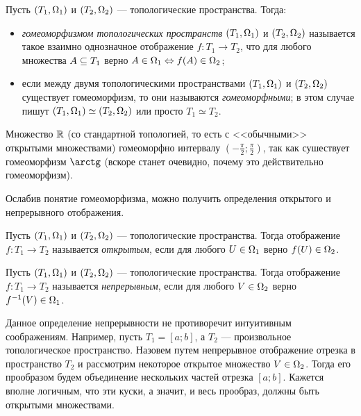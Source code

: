 \documentclass[main]{subfiles}
\begin{document}
\begin{definition}
	Пусть $ (T_1, \Omega_1) $ и $ (T_2, \Omega_2) $ --- топологические пространства. Тогда:
	\begin{itemize}
		\item \emph{гомеоморфизмом топологических пространств} $ (T_1, \Omega_1) $ и $ (T_2, \Omega_2) $ называется такое
			взаимно однозначное отображение $ f \colon T_1 \to T_2 $, что для любого множества $ A \subseteq T_1 $ верно
			$ A \in \Omega_1 \Leftrightarrow f(A) \in \Omega_2 $;
		\item если между двумя топологическими пространствами $ (T_1, \Omega_1) $ и $ (T_2, \Omega_2) $ существует
			гомеоморфизм, то они называются \emph{гомеоморфными}; в этом случае пишут
			$ (T_1, \Omega_1 ) \simeq (T_2, \Omega_2) $ или просто $ T_1 \simeq T_2 $.
	\end{itemize}
\end{definition}

\begin{example}
	Множество $ \mathbb{R} $ (со стандартной топологией, то есть с <<обычными>> открытыми множествами) гомеоморфно
	интервалу $ \left( -\frac{\pi}{2}; \frac{\pi}{2} \right) $, так как сушествует гомеоморфизм $ \arctg $ (вскоре станет
	очевидно, почему это действительно гомеоморфизм).
\end{example}

Ослабив понятие гомеоморфизма, можно получить определения открытого и непрерывного отображения.

\begin{definition}
	Пусть $ (T_1, \Omega_1) $ и $ (T_2, \Omega_2) $ --- топологические пространства. Тогда отображение
	$ f \colon T_1 \to T_2 $ называется \emph{открытым}, если для любого $ U \in \Omega_1 $ верно $ f(U) \in \Omega_2 $.
\end{definition}

\begin{definition}
	Пусть $ (T_1, \Omega_1) $ и $ (T_2, \Omega_2) $ --- топологические пространства. Тогда отображение
	$ f \colon T_1 \to T_2 $ называется \emph{непрерывным}, если для любого $ V \in \Omega_2 $ верно
	$ f^{-1}(V) \in \Omega_1 $.
\end{definition}

\begin{remark}
	Данное определение непрерывности не противоречит интуитивным соображениям. Например,
	пусть $ T_1 = [a; b] $, а $ T_2 $ --- произвольное топологическое пространство. Назовем путем непрерывное
	отображение отрезка в пространство $ T_2 $ и рассмотрим некоторое открытое множество $ V \in \Omega_2 $. Тогда его
	прообразом будем объединение нескольких частей отрезка $ [a; b] $. Кажется вполне логичным, что эти куски,
	а значит, и весь прообраз, должны быть открытыми множествами.
\end{remark}
\end{document}
